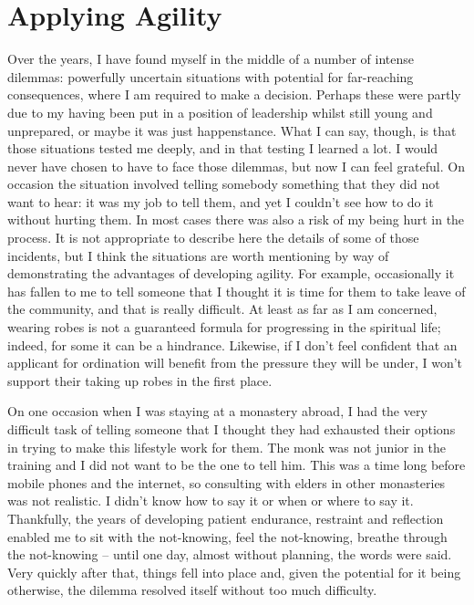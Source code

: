 \section{Applying Agility}

Over the years, I have found myself in the middle of a number of intense
dilemmas: powerfully uncertain situations with potential for
far-reaching consequences, where I am required to make a decision.
Perhaps these were partly due to my having been put in a position of
leadership whilst still young and unprepared, or maybe it was just
happenstance. What I can say, though, is that those situations tested me
deeply, and in that testing I learned a lot. I would never have chosen
to have to face those dilemmas, but now I can feel grateful. On occasion
the situation involved telling somebody something that they did not want
to hear: it was my job to tell them, and yet I couldn't see how to do it
without hurting them. In most cases there was also a risk of my being
hurt in the process. It is not appropriate to describe here the details
of some of those incidents, but I think the situations are worth
mentioning by way of demonstrating the advantages of developing agility.
For example, occasionally it has fallen to me to tell someone that I
thought it is time for them to take leave of the community, and that is
really difficult. At least as far as I am concerned, wearing robes is
not a guaranteed formula for progressing in the spiritual life; indeed,
for some it can be a hindrance. Likewise, if I don't feel confident that
an applicant for ordination will benefit from the pressure they will be
under, I won't support their taking up robes in the first place.

On one occasion when I was staying at a monastery abroad, I had the very
difficult task of telling someone that I thought they had exhausted
their options in trying to make this lifestyle work for them. The monk
was not junior in the training and I did not want to be the one to tell
him. This was a time long before mobile phones and the internet, so
consulting with elders in other monasteries was not realistic. I didn't
know how to say it or when or where to say it. Thankfully, the years of
developing patient endurance, restraint and reflection enabled me to sit
with the not-knowing, feel the not-knowing, breathe through the
not-knowing -- until one day, almost without planning, the words were
said. Very quickly after that, things fell into place and, given the
potential for it being otherwise, the dilemma resolved itself without
too much difficulty.

